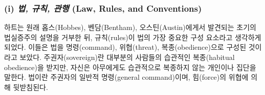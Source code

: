 \documentclass[12pt, oneside]{book}  %
\begin{document}
\subsubsection{\texorpdfstring{(i) \emph{법, 규칙, 관행} (Law, Rules,
and
Conventions)}{(i) 법, 규칙, 관행 (Law, Rules, and Conventions)}}\label{i-uxbc95-uxaddcuxce59-uxad00uxd589-law-rules-and-conventions}

하트는 원래 홉스(Hobbes), 벤담(Bentham), 오스틴(Austin)에게서 발견되는
초기의 법실증주의 설명을 거부한 뒤, 규칙(rules)이 법의 가장 중요한 구성
요소라고 생각하게 되었다. 이들은 법을 명령(command), 위협(threat),
복종(obedience)으로 구성된 것이라고 보았다. 주권자(sovereign)란 대부분의
사람들의 습관적인 복종(habitual obedience)을 받지만, 자신은 아무에게도
습관적으로 복종하지 않는 개인이나 집단을 말한다. 법이란 주권자의 일반적
명령(general command)이며, 힘(force)의 위협에 의해 뒷받침된다.
\end{document}
